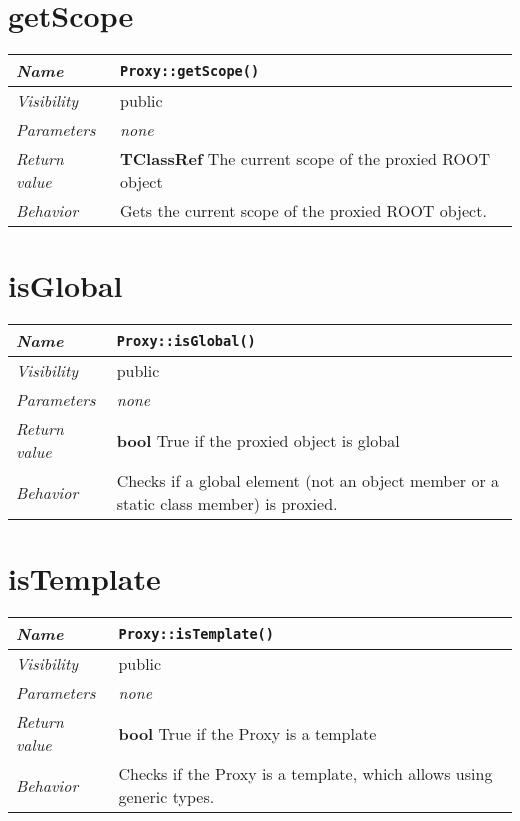  \section{getScope}
\begin{longtable}{p{3cm} @{\hskip 1cm} p{12cm}}
 \hline
\textit{Name} & \texttt{Proxy::getScope()}\\
\hline
 \textit{Visibility} & public\\
\hline
\textit{Parameters} & \textit{none}\\
\hline
\textit{Return value} & \textbf{TClassRef} The current scope of the proxied ROOT object \\
  \hline
 \textit{Behavior} & Gets the current scope of the proxied ROOT object. \\
\hline
\end{longtable} \pagebreak
 \section{isGlobal}
\begin{longtable}{p{3cm} @{\hskip 1cm} p{12cm}}
 \hline
\textit{Name} & \texttt{Proxy::isGlobal()}\\
\hline
 \textit{Visibility} & public\\
\hline
\textit{Parameters} & \textit{none}\\
\hline
\textit{Return value} & \textbf{bool} True if the proxied object is global \\
  \hline
 \textit{Behavior} & Checks if a global element (not an object member or a static class member) is proxied. \\
\hline
\end{longtable}
 \section{isTemplate}
\begin{longtable}{p{3cm} @{\hskip 1cm} p{12cm}}
 \hline
\textit{Name} & \texttt{Proxy::isTemplate()}\\
\hline
 \textit{Visibility} & public\\
\hline
\textit{Parameters} & \textit{none}\\
\hline
\textit{Return value} & \textbf{bool} True if the Proxy is a template \\
  \hline
 \textit{Behavior} & Checks if the Proxy is a template, which allows using generic types. \\
\hline
\end{longtable}
